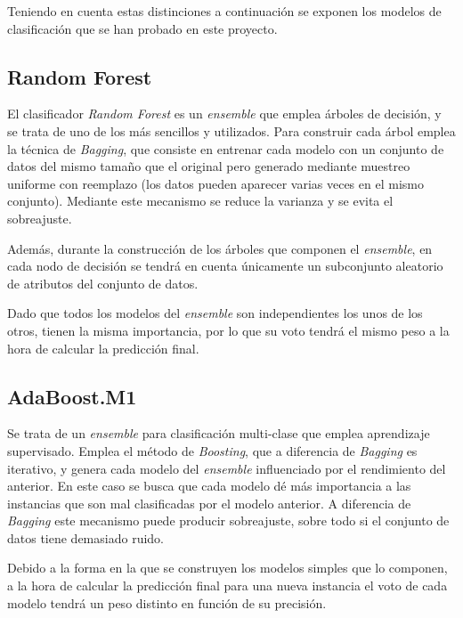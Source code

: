 Teniendo en cuenta estas distinciones a continuación se exponen los modelos de clasificación que se han probado en este proyecto.

\subsection{Random Forest}

El clasificador \textit{Random Forest} es un \textit{ensemble} que emplea  árboles de decisión, y se trata de uno de los más sencillos y utilizados. Para construir cada árbol emplea la técnica de \textit{Bagging}, que consiste en entrenar cada modelo con un conjunto de datos del mismo tamaño que el original pero generado mediante muestreo uniforme con reemplazo (los datos pueden aparecer varias veces en el mismo conjunto). Mediante este mecanismo se reduce la varianza y se evita el sobreajuste. 

Además, durante la construcción de los árboles que componen el \textit{ensemble}, en cada nodo de decisión se tendrá en cuenta únicamente un subconjunto aleatorio de atributos del conjunto de datos.

Dado que todos los modelos del \textit{ensemble} son independientes los unos de los otros, tienen la misma importancia, por lo que su voto tendrá el mismo peso a la hora de calcular la predicción final. 


\subsection{AdaBoost.M1}

Se trata de un \textit{ensemble} para clasificación multi-clase que emplea aprendizaje supervisado. Emplea el método de \textit{Boosting}, que a diferencia de \textit{Bagging} es iterativo, y genera cada modelo del \textit{ensemble} influenciado por el rendimiento del anterior. En este caso se busca que cada modelo dé más importancia a las instancias que son mal clasificadas por el modelo anterior. A diferencia de \textit{Bagging} este mecanismo puede producir sobreajuste, sobre todo si el conjunto de datos tiene demasiado ruido. 

Debido a la forma en la que se construyen los modelos simples que lo componen, a la hora de calcular la predicción final para una nueva instancia el voto de cada modelo tendrá un peso distinto en función de su precisión.  

